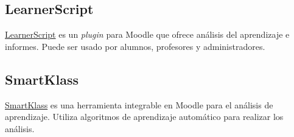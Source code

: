 
\subsection{LearnerScript}
\href{https://learnerscript.com/}{LearnerScript} es un \emph{plugin} para Moodle que ofrece análisis del aprendizaje e informes. Puede ser usado por alumnos, profesores y administradores.


\subsection{SmartKlass}
\href{https://moodle.org/plugins/local_smart_klass}{SmartKlass} es una herramienta integrable en Moodle para el análisis de aprendizaje. Utiliza algoritmos de aprendizaje automático para realizar los análisis.

